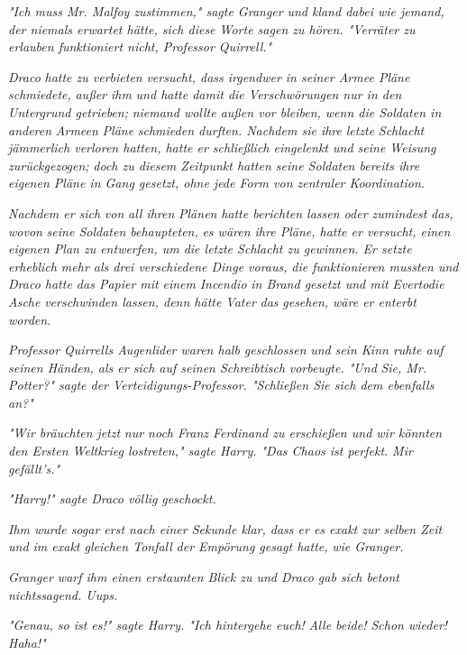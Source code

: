 {\emph{"Ich muss Mr. Malfoy zustimmen," sagte Granger} \emph{und kland dabei wie jemand, der niemals erwartet hätte, sich diese Worte sagen zu hören. "Verräter zu erlauben funktioniert nicht, Professor Quirrell."}

\emph{Draco} \emph{hatte zu verbieten} \emph{versucht, dass irgendwer in seiner Armee Pläne schmiedete,} \emph{außer ihm} \emph{und hatte damit die Verschwörungen nur in den Untergrund getrieben;} \emph{niemand wollte außen vor bleiben, wenn die Soldaten in} \emph{\emph{anderen}} \emph{Armeen} \emph{Pläne} \emph{schmieden durften. Nachdem sie ihre} \emph{letzte} \emph{Schlacht jämmerlich verloren hatten, hatte er schließlich eingelenkt und seine Weisung zurückgezogen;} \emph{doch zu diesem Zeitpunkt hatten seine Soldaten bereits ihre eigenen Pläne in Gang gesetzt, ohne jede Form von zentraler Koordination.}

\emph{Nachdem er sich} \emph{von} \emph{all ihren} \emph{Plänen} \emph{hatte berichten lassen oder zumindest} \emph{das,} \emph{wovon} \emph{seine Soldaten behaupteten,} \emph{es wären ihre Pläne, hatte er versucht, einen eigenen Plan zu entwerfen, um die letzte Schlacht zu gewinnen. Er setzte erheblich mehr als drei verschiedene Dinge voraus,} \emph{die funktionieren mussten und Draco hatte das Papier mit} \emph{einem} \emph{\emph{Incendio}} \emph{in Brand gesetzt und mit} \emph{\emph{Everto}die Asche} \emph{verschwinden lassen, denn hätte Vater} \emph{das} \emph{gesehen, wäre er enterbt worden.}

\emph{Professor Quirrells Augenlider waren halb geschlossen} \emph{und} \emph{sein Kinn ruhte auf seinen Händen, als er sich auf seinen Schreibtisch} \emph{vorbeugte. "Und} \emph{Sie, Mr. Potter?" sagte der Verteidigungs-Professor. "Schließen Sie sich dem ebenfalls an?"}

\emph{"Wir bräuchten} \emph{jetzt} \emph{nur noch Franz Ferdinand zu erschießen und wir könnten den Ersten Weltkrieg lostreten," sagte Harry. "Das Chaos ist perfekt.} \emph{Mir gefällt's."}

\emph{"\emph{Harry!}" sagte Draco völlig} \emph{geschockt.}

\emph{Ihm wurde sogar erst nach einer Sekunde klar, dass er es exakt zur selben Zeit und im exakt gleichen Tonfall} \emph{der Empörung gesagt hatte,} \emph{wie Granger.}

\emph{Granger warf ihm einen erstaunten Blick zu und Draco gab sich betont} \emph{nichtssagend. Uups.}

\emph{"Genau, so ist es!" sagte Harry. "Ich hintergehe euch!} \emph{Alle beide! Schon wieder! Haha!"}

}
